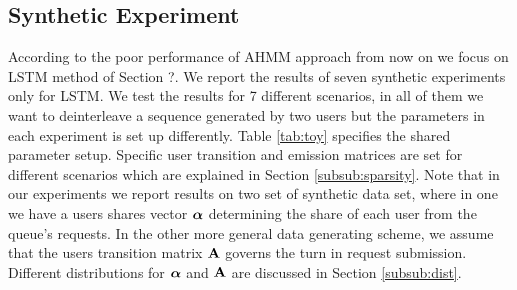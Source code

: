 	\subsection{Synthetic Experiment}
	\label{subsec:synthetic}
	According to the poor performance of AHMM approach from now on we focus on LSTM method of Section ?.
	We report the results of seven synthetic experiments only for LSTM. %
	We test the results for 7 different scenarios, in all of them we want to deinterleave a sequence generated by two users but the parameters in each experiment is set up differently.
	Table \ref{tab:toy} specifies the shared parameter setup. %
	Specific user transition and emission matrices are set for different scenarios which are explained in Section \ref{subsub:sparsity}.
	Note that in our experiments we report results on two set of synthetic data set, where in one we have a users shares vector $\boldsymbol{\alpha}$ determining the share of each user from the queue's requests.
	In the other more general data generating scheme, we assume that the users transition matrix $\mathbf{A}$ governs the turn in request submission.
	Different distributions for $\boldsymbol{\alpha}$ and $\mathbf{A}$ are discussed in Section \ref{subsub:dist}.
	
